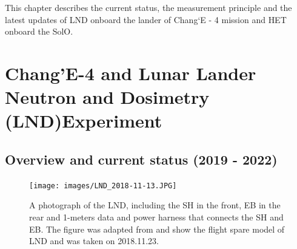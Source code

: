 This chapter describes the current status, the measurement principle and the latest updates of \ac{LND} onboard the lander of Chang`E - 4 mission and \ac{HET} onboard the \ac{SolO}. 

\section{Chang'E-4 and Lunar Lander Neutron and Dosimetry (LND)Experiment}
\label{sec:change_4_LND}

\subsection{Overview and current status (2019 - 2022)}

\begin{figure}
    \centering
    \texttt{[image: images/LND\_2018-11-13.JPG]}
    \caption[A Photograph of the \ac{LND}]{A photograph of the \ac{LND}, including the \ac{SH} in the front, \ac{EB} in the rear and 1-meters data and power harness that connects the \ac{SH} and \ac{EB}. The figure was adapted from \citet{Wimmer2020SSRv} and show the flight spare model of LND and was taken on 2018.11.23.}
    \label{Fig:LND_instrument}
\end{figure}


